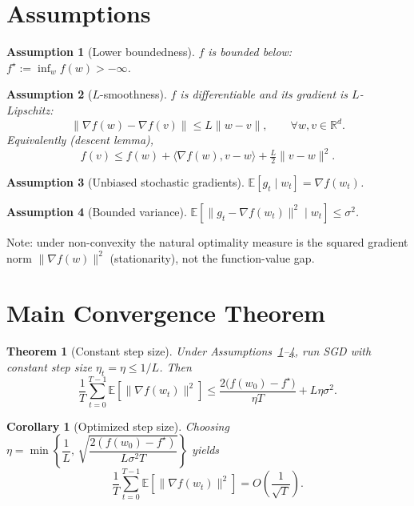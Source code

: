 \documentclass[11pt]{article}
\newtheorem{theorem}{Theorem}
\newtheorem{assumption}{Assumption}
\newtheorem{corollary}{Corollary}
\begin{document}
\section*{Assumptions}
\begin{assumption}[Lower boundedness]\label{as:bounded}
$f$ is bounded below: $f^\star:=\inf_{w}f(w)>-\infty$.
\end{assumption}

\begin{assumption}[$L$-smoothness]\label{as:smooth}
$f$ is differentiable and its gradient is $L$-Lipschitz:
\[
\|\nabla f(w)-\nabla f(v)\|\le L\|w-v\|,\qquad\forall w,v\in\mathbb{R}^d.
\]
Equivalently (descent lemma),
\[
f(v)\le f(w)+\langle\nabla f(w),v-w\rangle+\tfrac{L}{2}\|v-w\|^2.
\]
\end{assumption}

\begin{assumption}[Unbiased stochastic gradients]\label{as:unbiased}
$\mathbb{E}[g_t\mid w_t]=\nabla f(w_t)$.
\end{assumption}

\begin{assumption}[Bounded variance]\label{as:var}
$\mathbb{E}\!\left[\|g_t-\nabla f(w_t)\|^2\mid w_t\right]\le\sigma^2$.
\end{assumption}

Note: under non-convexity the natural optimality measure is the squared
gradient norm $\|\nabla f(w)\|^2$ (stationarity), not the function-value gap.

\section*{Main Convergence Theorem}
\begin{theorem}[Constant step size]\label{thm:const}
Under Assumptions~\ref{as:bounded}--\ref{as:var}, run SGD with constant
step size $\eta_t=\eta\le 1/L$. Then
\[
\frac{1}{T}\sum_{t=0}^{T-1}\mathbb{E}\!\left[\|\nabla f(w_t)\|^2\right]
\le \frac{2\bigl(f(w_0)-f^\star\bigr)}{\eta T}+L\eta\sigma^2.
\]
\end{theorem}

\begin{corollary}[Optimized step size]\label{cor:opt}
Choosing
$\eta=\min\!\left\{\dfrac{1}{L},\,\sqrt{\dfrac{2(f(w_0)-f^\star)}{L\sigma^2 T}}\right\}$
yields
\[
\frac{1}{T}\sum_{t=0}^{T-1}\mathbb{E}\!\left[\|\nabla f(w_t)\|^2\right]
= O\!\left(\frac{1}{\sqrt{T}}\right).
\]
\end{corollary}
\end{document}
